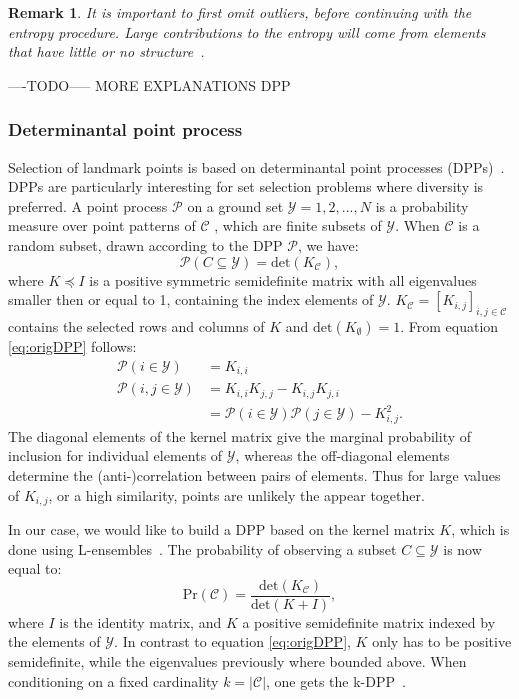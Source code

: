 \documentclass[preprint,12pt]{elsarticle}
\newtheorem*{remark}{Remark}
\begin{document}
\begin{remark}
	It is important to first omit outliers, before continuing with the entropy procedure. Large contributions to the entropy will come from elements that have little or no structure~\cite{girolami2002orthogonal}.
\end{remark}

----TODO-----
MORE EXPLANATIONS DPP


\subsubsection{Determinantal point process}
Selection of landmark points is based on determinantal point processes (DPPs)~\cite{kulesza2012determinantal}. DPPs are particularly interesting for set selection problems where diversity is preferred. A point process $\mathcal{P}$ on a ground set $\mathcal{Y} = {1,2,...,N}$ is a probability measure over point patterns of $\mathcal{C}$ , which are finite subsets of $\mathcal{Y}$. When $\mathcal{C}$ is a random subset, drawn according to the DPP $\mathcal{P}$, we have:
\begin{equation}
\label{eq:origDPP}
	\mathcal{P}(C \subseteq \mathcal{Y}) = \mathrm{det}(K_{\mathcal{C}}),
\end{equation}
where $K \preceq I$ is a positive symmetric semidefinite matrix with all eigenvalues smaller then or equal to 1, containing the index elements of $\mathcal{Y}$. $K_{\mathcal{C}} = [K_{i,j}]_{i,j \in \mathcal{C}}$ contains the selected rows and columns of $K$ and $\mathrm{det}(K_{\emptyset}) = 1$. From equation \eqref{eq:origDPP} follows:
\begin{align}
	\mathcal{P}(i \in \mathcal{Y}) &= K_{i,i} \\
	\mathcal{P}(i,j \in \mathcal{Y}) &= K_{i,i}K_{j,j} - K_{i,j}K_{j,i}\\
	\label{eq:KDPP}
	&= \mathcal{P}(i \in \mathcal{Y})\mathcal{P}(j \in \mathcal{Y}) - K_{i,j}^2.
\end{align}
The diagonal elements of the kernel matrix give the marginal probability of inclusion for individual elements of $\mathcal{Y}$, whereas the off-diagonal elements determine the (anti-)correlation between pairs of elements. Thus for large values of $K_{i,j}$, or a high similarity, points are unlikely the appear together. 

In our case, we would like to build a DPP based on the kernel matrix $K$, which is done using L-ensembles~\cite{borodin2009determinantal}. The probability of observing a subset $C \subseteq \mathcal{Y}$ is now equal to:
\begin{equation}
	\mathrm{Pr}(\mathcal{C}) = \frac{\mathrm{det}(K_{\mathcal{C}})}{\mathrm{det}(K + I)},
\end{equation}
where $I$ is the identity matrix, and $K$ a positive semidefinite matrix  indexed by the elements of $\mathcal{Y}$. In contrast to equation \eqref{eq:origDPP}, $K$ only has to be positive semidefinite, while the eigenvalues previously where bounded above. When conditioning on a fixed cardinality $k = |\mathcal{C}|$, one gets the k-DPP~\cite{kulesza2011k}.
\end{document}
